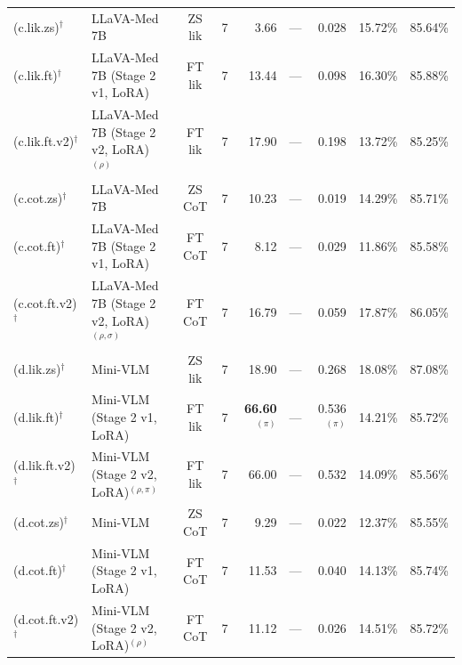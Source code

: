 \begin{table}[htbp]
{\begin{tabular}{@{}llccrrrrr@{}}
\rowcolor{thiswork}
(c.lik.zs)$^\dagger$ & LLaVA-Med 7B
  & ZS lik & 7
  & 3.66 & --- & 0.028 & 15.72\% & 85.64\% \\

\rowcolor{thiswork}
(c.lik.ft)$^\dagger$ & LLaVA-Med 7B (Stage 2 v1, LoRA)
  & FT lik & 7
  & 13.44 & --- & 0.098 & 16.30\% & 85.88\% \\

\rowcolor{thiswork}
(c.lik.ft.v2)$^\dagger$ & LLaVA-Med 7B (Stage 2 v2, LoRA)$^{(\rho)}$
  & FT lik & 7
  & 17.90 & --- & 0.198 & 13.72\% & 85.25\% \\

\rowcolor{thiswork}
(c.cot.zs)$^\dagger$ & LLaVA-Med 7B
  & ZS CoT & 7
  & 10.23 & --- & 0.019 & 14.29\% & 85.71\% \\

\rowcolor{thiswork}
(c.cot.ft)$^\dagger$ & LLaVA-Med 7B (Stage 2 v1, LoRA)
  & FT CoT & 7
  & 8.12 & --- & 0.029 & 11.86\% & 85.58\% \\

\rowcolor{thiswork}
(c.cot.ft.v2)$^\dagger$ & LLaVA-Med 7B (Stage 2 v2, LoRA)$^{(\rho,\sigma)}$
  & FT CoT & 7
  & 16.79 & --- & 0.059 & 17.87\% & 86.05\% \\

\rowcolor{thiswork}
(d.lik.zs)$^\dagger$ & Mini-VLM
  & ZS lik & 7
  & 18.90 & --- & 0.268 & 18.08\% & 87.08\% \\

\rowcolor{thiswork}
(d.lik.ft)$^\dagger$ & Mini-VLM (Stage 2 v1, LoRA)
  & FT lik & 7
  & \textbf{66.60}$^{(\pi)}$ & --- & 0.536$^{(\pi)}$ & 14.21\% & 85.72\% \\

\rowcolor{thiswork}
(d.lik.ft.v2)$^\dagger$ & Mini-VLM (Stage 2 v2, LoRA)$^{(\rho,\pi)}$
  & FT lik & 7
  & 66.00 & --- & 0.532 & 14.09\% & 85.56\% \\

\rowcolor{thiswork}
(d.cot.zs)$^\dagger$ & Mini-VLM
  & ZS CoT & 7
  & 9.29 & --- & 0.022 & 12.37\% & 85.55\% \\

\rowcolor{thiswork}
(d.cot.ft)$^\dagger$ & Mini-VLM (Stage 2 v1, LoRA)
  & FT CoT & 7
  & 11.53 & --- & 0.040 & 14.13\% & 85.74\% \\

\rowcolor{thiswork}
(d.cot.ft.v2)$^\dagger$ & Mini-VLM (Stage 2 v2, LoRA)$^{(\rho)}$
  & FT CoT & 7
  & 11.12 & --- & 0.026 & 14.51\% & 85.72\% \\


\end{tabular}}
\end{table}
